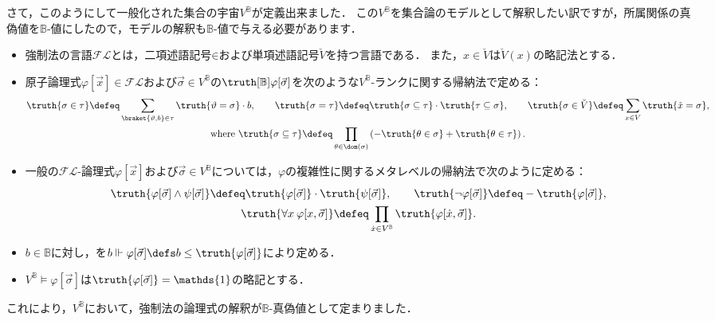 \documentclass[a4j]{ltjsarticle}
\renewcommand{\emph}[1]{\textbf{\textgt{#1}}}
\newcommand{\FL}{\mathord{\mathcal{F\!L}}}
\begin{document}
さて，このようにして一般化された集合の宇宙$V^{\mathbb{B}}$が定義出来ました．
この$V^{\mathbb{B}}$を集合論のモデルとして解釈したい訳ですが，所属関係の真偽値を$\mathbb{B}$-値にしたので，モデルの解釈も$\mathbb{B}$-値で与える必要があります．

\begin{definition}
 \begin{itemize}
  \item 強制法の言語$\FL$とは，二項述語記号$\mathord{\in}$および単項述語記号$\check{V}$を持つ言語である．
        また，$x \in \check{V}$は$\check{V}(x)$の略記法とする．
  \item 原子論理式$\varphi[\vec{x}] \in \FL$および$\vec{\sigma} \in V^{\mathbb{B}}$の\emph{真偽値}$\truth[\mathbb{B}]{\varphi[\vec{\sigma}]}$を次のような$V^{\mathbb{B}}$-ランクに関する帰納法で定める：
        \begin{gather*}
         \truth{\sigma \in \tau} \defeq \sum_{\braket{\vartheta, b} \in \tau} \truth{\vartheta = \sigma} \cdot b, \qquad
         \truth{\sigma = \tau} \defeq \truth{\sigma \subseteq \tau} \cdot \truth{\tau \subseteq \sigma},\qquad
         \truth{\sigma \in \check{V}} \defeq \sum_{x \in V} \truth{\check{x} = \sigma},\\
         \text{where }
         \truth{\sigma \subseteq \tau} \defeq \prod_{\theta \in \dom(\sigma)} \left(- \truth{\theta \in \sigma} + \truth{\theta \in \tau}\right).
        \end{gather*}
  \item 一般の$\FL$-論理式$\varphi[\vec{x}]$および$\vec{\sigma} \in V^{\mathbb{B}}$については，$\varphi$の複雑性に関するメタレベルの帰納法で次のように定める：
        \begin{gather*}
         \truth{\varphi[\vec{\sigma}] \wedge \psi[\vec{\sigma}] } \defeq \truth{\varphi[\vec{\sigma}]} \cdot \truth{\psi[\vec{\sigma}]}, \qquad
         \truth{\neg \varphi[\vec{\sigma}]} \defeq - \truth{\varphi[\vec{\sigma}]},\\
         \truth{\forall x \: \varphi[x, \vec{\sigma}]}
         \defeq \prod_{\dot{x} \in V^{\mathbb{B}}} \truth{\varphi[\dot{x}, \vec{\sigma}]}.
        \end{gather*}
  \item $b \in \mathbb{B}$に対し，\emph{強制関係}を$b \Vdash \varphi[\vec{\sigma}] \defs b \leq \truth{\varphi[\vec{\sigma}]}$により定める．
  \item $V^{\mathbb{B}} \models \varphi[\vec{\sigma}]$は$\truth{\varphi[\vec{\sigma}]} = \mathds{1}$の略記とする．
 \end{itemize}
\end{definition}
これにより，$V^{\mathbb{B}}$において，強制法の論理式の解釈が$\mathbb{B}$-真偽値として定まりました．
\end{document}
